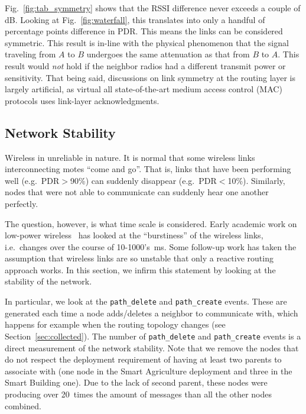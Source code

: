 \documentclass{elsarticle}
\newcommand{\building}            {Smart Building\xspace}
\newcommand{\agri}                {Smart Agriculture\xspace}
\newcommand{\pathcreate}          {{\tt path\_create}\xspace}
\newcommand{\pathdelete}          {{\tt path\_delete}\xspace}
\begin{document}
Fig.~\ref{fig:tab_symmetry} shows that the RSSI difference never exceeds a couple of dB.
Looking at Fig.~\ref{fig:waterfall}, this translates into only a handful of percentage points difference in PDR.
This means the links can be considered symmetric.
This result is in-line with the physical phenomenon that the signal traveling from $A$ to $B$ undergoes the same attenuation as that from $B$ to $A$.
This result would \textit{not} hold if the neighbor radios had a different transmit power or sensitivity.
That being said, discussions on link symmetry at the routing layer is largely artificial, as virtual all state-of-the-art medium access control (MAC) protocols uses link-layer acknowledgments.

\subsection{Network Stability}
\label{sec:net_stability}


Wireless in unreliable in nature.
It is normal that some wireless links interconnecting motes ``come and go''.
That is, links that have been performing well (e.g.~PDR$>$90\%) can suddenly disappear (e.g.~PDR$<$10\%).
Similarly, nodes that were not able to communicate can suddenly hear one another perfectly.


The question, however, is what time scale is considered.
Early academic work on low-power wireless~\cite{srinivasan08beta} has looked at the ``burstiness'' of the wireless links, i.e.~changes over the course of 10-1000's~ms.
Some follow-up work has taken the assumption that wireless links are so unstable that only a reactive routing approach works.
In this section, we infirm this statement by looking at the stability of the network.


In particular, we look at the \pathdelete and \pathcreate events.
These are generated each time a node adds/deletes a neighbor to communicate with, which happens for example when the routing topology changes (see Section~\ref{sec:collected}).
The number of \pathdelete and \pathcreate events is a direct measurement of the network stability.
Note that we remove the nodes that do not respect the deployment requirement of having at least two parents to associate with (one node in the \agri deployment and three in the \building one).
Due to the lack of second parent, these nodes were producing over 20~times the amount of messages than all the other nodes combined.
\end{document}
